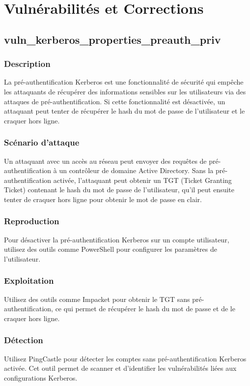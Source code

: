 \documentclass{article}
\begin{document}
\section{Vulnérabilités et Corrections}

\subsection{vuln\_kerberos\_properties\_preauth\_priv}

\subsubsection{Description}
La pré-authentification Kerberos est une fonctionnalité de sécurité qui empêche les attaquants de récupérer des informations sensibles sur les utilisateurs via des attaques de pré-authentification. Si cette fonctionnalité est désactivée, un attaquant peut tenter de récupérer le hash du mot de passe de l'utilisateur et le craquer hors ligne.

\subsubsection{Scénario d'attaque}
Un attaquant avec un accès au réseau peut envoyer des requêtes de pré-authentification à un contrôleur de domaine Active Directory. Sans la pré-authentification activée, l'attaquant peut obtenir un TGT (Ticket Granting Ticket) contenant le hash du mot de passe de l'utilisateur, qu'il peut ensuite tenter de craquer hors ligne pour obtenir le mot de passe en clair.

\subsubsection{Reproduction}
Pour désactiver la pré-authentification Kerberos sur un compte utilisateur, utilisez des outils comme PowerShell pour configurer les paramètres de l'utilisateur.

\subsubsection{Exploitation}
Utilisez des outils comme Impacket pour obtenir le TGT sans pré-authentification, ce qui permet de récupérer le hash du mot de passe et de le craquer hors ligne.

\subsubsection{Détection}
Utilisez PingCastle pour détecter les comptes sans pré-authentification Kerberos activée. Cet outil permet de scanner et d'identifier les vulnérabilités liées aux configurations Kerberos.
\end{document}
